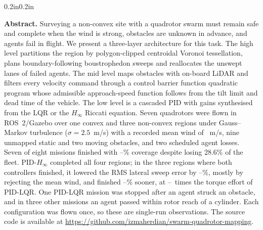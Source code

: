 \documentclass[10pt,letterpaper]{article}
\newif\ifanon
\newcommand{\LatRedDoneMin}{\fpeval{round(100*min(1-\LatrmsLshapeHinf/\LatrmsLshapeLqr,1-\LatrmsUshapeHinf/\LatrmsUshapeLqr,1-\LatrmsPlusHinf/\LatrmsPlusLqr),0)}}
\newcommand{\LatRedDoneMax}{\fpeval{round(100*max(1-\LatrmsLshapeHinf/\LatrmsLshapeLqr,1-\LatrmsUshapeHinf/\LatrmsUshapeLqr,1-\LatrmsPlusHinf/\LatrmsPlusLqr),0)}}
\newcommand{\Hinf}{PID-$H_\infty$}
\newcommand{\LQR}{PID-LQR}
\begin{document}
\vspace{0.6ex}
\begin{adjustwidth}{0.2in}{0.2in}
{\fontsize{9}{11}\selectfont\noindent\textbf{Abstract.}
Surveying a non-convex site with a quadrotor swarm must remain safe and complete when the
wind is strong, obstacles are unknown in advance, and agents fail in flight. We present a
three-layer architecture for this task. The high level partitions the region by polygon-clipped
centroidal Voronoi tessellation, plans boundary-following boustrophedon sweeps and reallocates
the unswept lanes of failed agents. The mid level maps obstacles with on-board LiDAR and filters
every velocity command through a control barrier function quadratic program whose
admissible approach-speed function follows from the tilt limit and dead time of the vehicle. The low
level is a cascaded PID with gains synthesised from the LQR or the $H_\infty$ Riccati equation.
Seven quadrotors were flown in ROS~2/Gazebo over one convex and three non-convex regions under
Gauss--Markov turbulence ($\sigma=2.5$~m/s) with a recorded mean wind of \WindMeanMag~m/s, nine unmapped
static and two moving obstacles, and two scheduled agent losses. Seven of eight missions
finished with \CovMin--\CovMax\% coverage despite losing 28.6\% of the fleet. \Hinf{} completed
all four regions; in the three regions where both controllers finished, it lowered the RMS lateral
sweep error by \LatRedDoneMin--\LatRedDoneMax\%, mostly by rejecting the mean wind, and finished
\TimeRedMin--\TimeRedMax\% sooner, at \EffRatioMin--\EffRatioMax\ times the torque effort of \LQR{}.
One \LQR{} mission was stopped after an agent struck an obstacle, and in three other missions an
agent passed within rotor reach of a cylinder. Each configuration was flown once, so these are
single-run observations. The source code is available at
\ifanon [link removed for double-blind review]\else\url{https://github.com/izmaherdian/swarm-quadrotor-mapping}\fi.
\par}
\end{adjustwidth}
\end{document}
